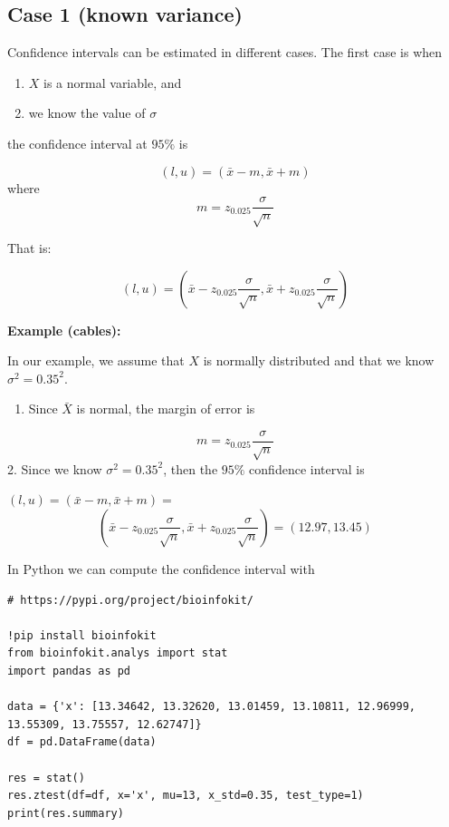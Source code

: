 \documentclass[
]{book}
\providecommand{\tightlist}{%
  \setlength{\itemsep}{0pt}\setlength{\parskip}{0pt}}
\begin{document}
\hypertarget{case-1-known-variance}{%
\subsection{Case 1 (known variance)}\label{case-1-known-variance}}

Confidence intervals can be estimated in different cases. The first case is when

\begin{enumerate}
\def\labelenumi{\arabic{enumi}.}
\tightlist
\item
  \(X\) is a normal variable, and
\item
  we know the value of \(\sigma\)
\end{enumerate}

the confidence interval at \(95\%\) is

\[(l,u)=(\bar{x} - m, \bar{x} + m)\]
where \[m=z_{0.025} \frac{\sigma}{\sqrt{n}}\]

That is:

\[(l,u)=(\bar{x} - z_{0.025} \frac{\sigma}{\sqrt{n}}, \bar{x} + z_{0.025} \frac{\sigma}{\sqrt{n}})\]

\textbf{Example (cables):}

In our example, we assume that \(X\) is normally distributed and that we know \(\sigma^2=0.35^2\).

\begin{enumerate}
\def\labelenumi{\arabic{enumi}.}
\tightlist
\item
  Since \(\bar{X}\) is normal, the margin of error is
\end{enumerate}

\[m=z_{0.025} \frac{\sigma}{\sqrt{n}}\]
2. Since we know \(\sigma^2=0.35^2\), then the \(95\%\) confidence interval is

\((l,u)=(\bar{x} - m, \bar{x} + m)=\) \[(\bar{x}-z_{0.025} \frac{\sigma}{\sqrt{n}}, \bar{x}+z_{0.025} \frac{\sigma}{\sqrt{n}})= (12.97,13.45)\]

In Python we can compute the confidence interval with

\begin{verbatim}
# https://pypi.org/project/bioinfokit/

!pip install bioinfokit
from bioinfokit.analys import stat
import pandas as pd

data = {'x': [13.34642, 13.32620, 13.01459, 13.10811, 12.96999, 13.55309, 13.75557, 12.62747]}
df = pd.DataFrame(data)

res = stat()
res.ztest(df=df, x='x', mu=13, x_std=0.35, test_type=1)
print(res.summary)
\end{verbatim}
\end{document}
